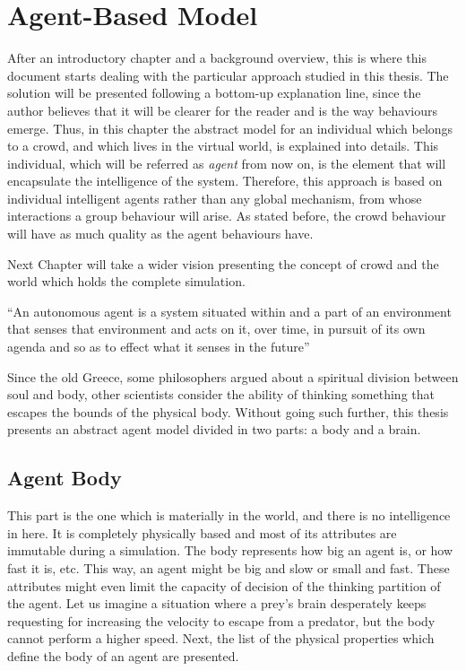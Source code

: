 \ifx\isEmbedded\undefined

\graphicspath{{../img/}}

\fi

\chapter{Agent-Based Model}
\label{chap:agent-based_model}

After an introductory chapter and a background overview, this is where this document starts dealing with the particular approach studied in this thesis. The solution will be presented following a bottom-up explanation line, since the author believes that it will be clearer for the reader and is the way behaviours emerge. Thus, in this chapter the abstract model for an individual which belongs to a crowd, and which lives in the virtual world, is explained into details. This individual, which will be referred as \emph{agent} from now on, is the element that will encapsulate the intelligence of the system. Therefore, this approach is based on individual intelligent agents rather than any global mechanism, from whose interactions a group behaviour will arise. As stated before, the crowd behaviour will have as much quality as the agent behaviours have.

Next Chapter will take a wider vision presenting the concept of crowd and the world which holds the complete simulation.

``An autonomous agent is a system situated within and a part of an environment that senses that environment and acts on it, over time, in pursuit of its own agenda and so as to effect what it senses in the future'' \citep{buckland}

Since the old Greece, some philosophers argued about a spiritual division between soul and body, other scientists consider the ability of thinking something that escapes the bounds of the physical body. Without going such further, this thesis presents an abstract agent model divided in two parts: a body and a brain.

\section{Agent Body}

This part is the one which is materially in the world, and there is no intelligence in here. It is completely physically based and most of its attributes are immutable during a simulation. The body represents how big an agent is, or how fast it is, etc. This way, an agent might be big and slow or small and fast. These attributes might even limit the capacity of decision of the thinking partition of the agent. Let us imagine a situation where a prey's brain desperately keeps requesting for increasing the velocity to escape from a predator, but the body cannot perform a higher speed. Next, the list of the physical properties which define the body of an agent are presented.

